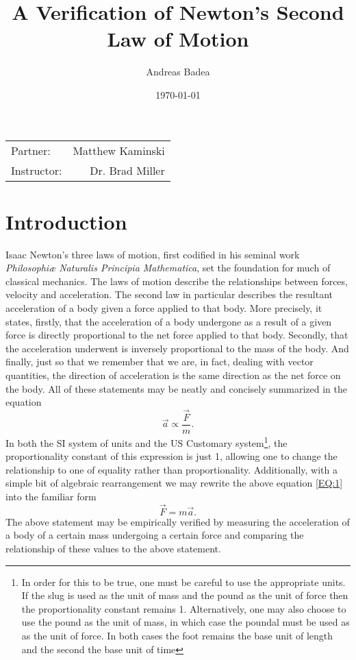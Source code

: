 \documentclass[11pt]{article}
\title{A Verification of Newton's Second Law of Motion}
\author{Andreas Badea}
\date{\today}
\begin{document}
\maketitle

\begin{center}
	\begin{tabular}{l r}
		Partner: & Matthew Kaminski \\ %
		Instructor: & Dr. Brad Miller %
	\end{tabular}
\end{center}

\section{Introduction}
Isaac Newton's three laws of motion, first codified in his seminal  work \textit{Philosophi\ae{} Naturalis Principia Mathematica}, set the foundation for much of classical mechanics. The laws of motion describe the relationships between forces, velocity and acceleration. The second law in particular describes the resultant acceleration of a body given a force applied to that body. More precisely, it states, firstly, that the acceleration of a body undergone as a result of a given force is directly proportional to the net force applied to that body. Secondly, that the acceleration underwent is inversely proportional to the mass of the body. And finally, just so that we remember that we are, in fact, dealing with vector quantities, the direction of acceleration is the same direction as the net force on the body. All of these statements may be neatly and concisely summarized in the equation
 \begin{equation}
\vec{a} \propto \frac{\vec{F}}{m}. \label{EQ:1}
\end{equation}
In both the SI system of units and the US Customary system\footnote{In order for this to be true, one must be careful to use the appropriate units. If the slug is used as the unit of mass and the pound as the unit of force then the proportionality constant remains 1. Alternatively, one may also choose to use the pound as the unit of mass, in which case the poundal must be used as as the unit of force. In both cases the foot remains the base unit of length and the second the base unit of time}, the proportionality constant of this expression is just 1, allowing one to change the relationship to one of equality rather than proportionality. Additionally, with a simple bit of algebraic rearrangement we may rewrite the above equation \eqref{EQ:1} into the familiar form
\begin{equation}
\vec{F} = m \vec{a}.
\end{equation}
The above statement may be empirically verified by measuring the acceleration of a body of a certain mass undergoing a certain force and comparing the relationship of these values to the above statement. 
\end{document}
